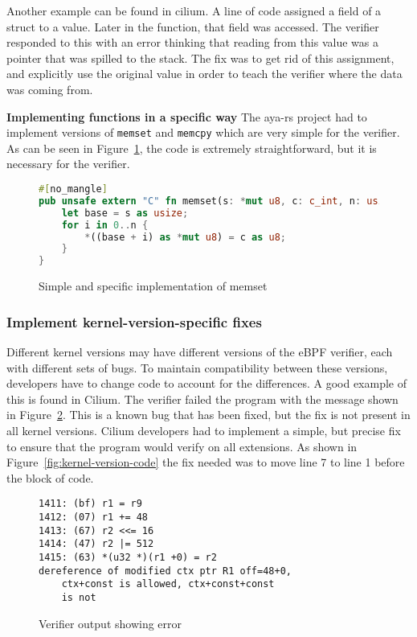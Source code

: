 Another example can be found in cilium.
A line of code assigned a field of a struct to a value.
Later in the function, that field was accessed.
The verifier responded to this with an error thinking that reading from this value was a pointer that was spilled to the stack.
The fix was to get rid of this assignment, and explicitly use the original value in order to teach the verifier where the data was coming from.

\noindent\textbf{Implementing functions in a specific way}
The aya-rs project had to implement versions of \texttt{memset} and \texttt{memcpy} which are very simple for the verifier.
As can be seen in Figure~\ref{fig:aya-memset}, the code is extremely straightforward, but it is necessary for the verifier.

\begin{figure}
    \begin{lstlisting}[language=rust]
#[no_mangle]
pub unsafe extern "C" fn memset(s: *mut u8, c: c_int, n: usize) {
    let base = s as usize;
    for i in 0..n {
        *((base + i) as *mut u8) = c as u8;
    }
}
    \end{lstlisting}
    \caption{Simple and specific implementation of memset}
    \label{fig:aya-memset}
\end{figure}

\subsubsection{Implement kernel-version-specific fixes}
Different kernel versions may have different versions of the eBPF verifier, each with different sets of bugs.
To maintain compatibility between these versions, developers have to change code to account for the differences.
A good example of this is found in Cilium.
The verifier failed the program with the message shown in Figure~\ref{fig:kernel-version}.
This is a known bug that has been fixed, but the fix is not present in all kernel versions.
Cilium developers had to implement a simple, but precise fix to ensure that the program would verify on all extensions.
As shown in Figure~\ref{fig:kernel-version-code} the fix needed was to move line 7 to line 1 before the block of code.

\begin{figure}
    \begin{lstlisting}[language=myC]
1411: (bf) r1 = r9
1412: (07) r1 += 48
1413: (67) r2 <<= 16
1414: (47) r2 |= 512
1415: (63) *(u32 *)(r1 +0) = r2
dereference of modified ctx ptr R1 off=48+0, 
    ctx+const is allowed, ctx+const+const 
    is not
    \end{lstlisting}
    \caption{Verifier output showing error}
    \label{fig:kernel-version}
\end{figure}

